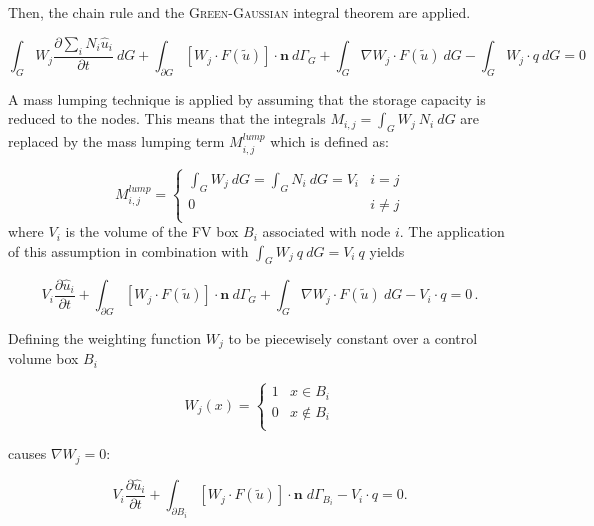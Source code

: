Then, the chain rule and the \textsc{Green-Gaussian} integral theorem are applied.

\begin{equation}
	\int_G W_j \frac{\partial \sum_i N_i \hat u_i}{\partial t} \: dG
	+ \int_{\partial G}  \left[ W_j \cdot F(\tilde u)\right]
	\cdot \mathbf n \: d\varGamma_G + \int_G  \nabla W_j \cdot F(\tilde u)
	\: dG - \int_G W_j \cdot q \: dG = 0
\end{equation}

A mass lumping technique is applied by assuming that the storage capacity is
reduced to the nodes. This means that the integrals $M_{i,j} = \int_G W_j \: N_i \: dG$
are replaced by the mass lumping term $M^{lump}_{i,j}$ which is defined as:

\begin{equation}
	 M^{lump}_{i,j} =\begin{cases} \int_G W_j \: dG = \int_G N_i \: dG = V_i &i = j\\
	0 &i \neq j\\
	         \end{cases}
\end{equation}
where $V_i$ is the volume of the FV box $B_i$ associated with node $i$.
The application of this assumption in combination with
$\int_G W_j \:q \: dG = V_i \: q$ yields

\begin{equation}
	V_i \frac{\partial \hat u_i}{\partial t}
	+ \int_{\partial G}  \left[ W_j \cdot F(\tilde u)\right]
	\cdot \mathbf n \: d\varGamma_G + \int_G  \nabla W_j \cdot F(\tilde u)
	\: dG- V_i \cdot q = 0 \, .
\end{equation}

Defining the weighting function $W_j$ to be piecewisely constant over a
control volume box $B_i$

\begin{equation}
	W_j(x) = \begin{cases}
	          1 &x \in B_i \\
		  0 &x \notin B_i\\
	         \end{cases}
\end{equation}

causes $\nabla W_j = 0$:

\begin{equation}
\label{eq:disc1}
	V_i \frac{\partial \hat u_i}{\partial t}
	+ \int_{\partial B_i}  \left[ W_j \cdot F(\tilde u)\right]
	\cdot \mathbf n  \;  d{\varGamma}_{B_i} - V_i \cdot q = 0 .
\end{equation}

